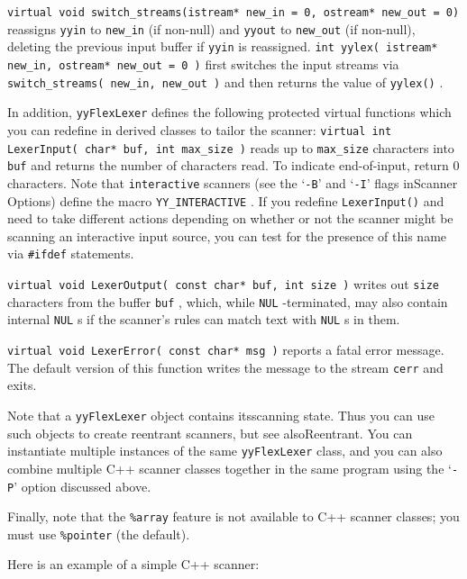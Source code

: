 \documentclass[openany,oneside]{book}
\begin{document}
 \verb`virtual void switch_streams(istream* new_in = 0, ostream* new_out = 0)` reassigns \verb`yyin` to \verb`new_in` (if non-null) and \verb`yyout` to \verb`new_out` (if non-null), deleting the previous input buffer if \verb`yyin` is reassigned. \verb`int yylex( istream* new_in, ostream* new_out = 0 )` first switches the input streams via \verb`switch_streams( new_in, new_out )` and then returns the value of \verb`yylex()` .

In addition, \verb`yyFlexLexer` defines the following protected virtual
functions which you can redefine in derived classes to tailor the
scanner: \verb`virtual int LexerInput( char* buf, int max_size )` reads up to \verb`max_size` characters into \verb`buf` and returns the
number of characters read.  To indicate end-of-input, return 0
characters.  Note that \verb`interactive` scanners (see the ‘\verb`-B`’
and ‘\verb`-I`’ flags inScanner Options) define the macro \verb`YY_INTERACTIVE` .  If you redefine \verb`LexerInput()` and need to
take different actions depending on whether or not the scanner might be
scanning an interactive input source, you can test for the presence of
this name via \verb`#ifdef` statements.

 \verb`virtual void LexerOutput( const char* buf, int size )` writes out \verb`size` characters from the buffer \verb`buf` , which, while \verb`NUL` -terminated, may also contain internal \verb`NUL` s if the
scanner's rules can match text with \verb`NUL` s in them.

 \verb`virtual void LexerError( const char* msg )` reports a fatal error message.  The default version of this function
writes the message to the stream \verb`cerr` and exits.

Note that a \verb`yyFlexLexer` object contains itsscanning state.  Thus you can use such objects to create reentrant
scanners, but see alsoReentrant.  You can instantiate multiple
instances of the same \verb`yyFlexLexer` class, and you can also combine
multiple C++ scanner classes together in the same program using the
‘\verb`-P`’ option discussed above.

Finally, note that the \verb`%array` feature is not available to C++
scanner classes; you must use \verb`%pointer` (the default).

Here is an example of a simple C++ scanner:
\end{document}
